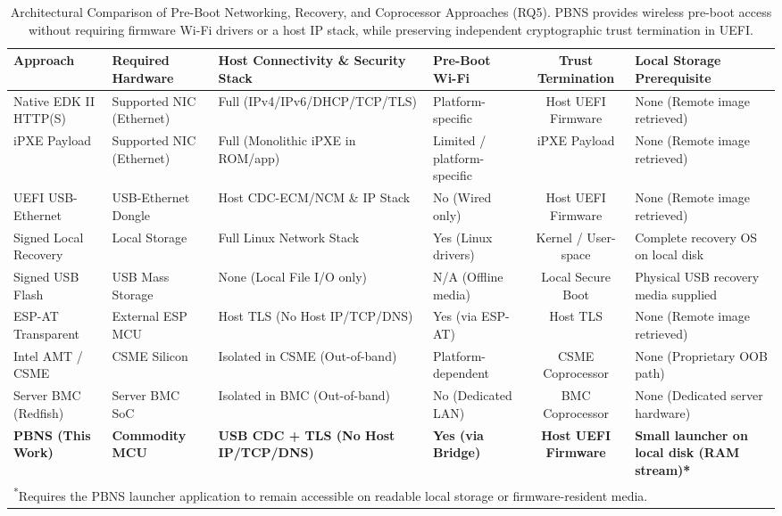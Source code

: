 \begin{table}[t]
\centering
\footnotesize
\renewcommand{\arraystretch}{0.92}
\caption{Architectural Comparison of Pre-Boot Networking, Recovery, and Coprocessor Approaches (RQ5). PBNS provides wireless pre-boot access without requiring firmware Wi-Fi drivers or a host IP stack, while preserving independent cryptographic trust termination in UEFI.}
\label{tab:rq4-comparison}
\begin{tabularx}{\textwidth}{llp{3.2cm}lcX}
\toprule
\textbf{Approach} & \textbf{Required Hardware} & \textbf{Host Connectivity \& Security Stack} & \textbf{Pre-Boot Wi-Fi} & \textbf{Trust Termination} & \textbf{Local Storage Prerequisite} \\
\midrule
Native EDK II HTTP(S) & Supported NIC (Ethernet) & Full (IPv4/IPv6/DHCP/TCP/TLS) & Platform-specific & Host UEFI Firmware & None (Remote image retrieved) \\
iPXE Payload & Supported NIC (Ethernet) & Full (Monolithic iPXE in ROM/app) & Limited / platform-specific & iPXE Payload & None (Remote image retrieved) \\
UEFI USB-Ethernet & USB-Ethernet Dongle & Host CDC-ECM/NCM \& IP Stack & No (Wired only) & Host UEFI Firmware & None (Remote image retrieved) \\
Signed Local Recovery & Local Storage & Full Linux Network Stack & Yes (Linux drivers) & Kernel / User-space & Complete recovery OS on local disk \\
Signed USB Flash & USB Mass Storage & None (Local File I/O only) & N/A (Offline media) & Local Secure Boot & Physical USB recovery media supplied \\
ESP-AT Transparent & External ESP MCU & Host TLS (No Host IP/TCP/DNS) & Yes (via ESP-AT) & Host TLS & None (Remote image retrieved) \\
Intel AMT / CSME & CSME Silicon & Isolated in CSME (Out-of-band) & Platform-dependent & CSME Coprocessor & None (Proprietary OOB path) \\
Server BMC (Redfish) & Server BMC SoC & Isolated in BMC (Out-of-band) & No (Dedicated LAN) & BMC Coprocessor & None (Dedicated server hardware) \\
\midrule
\textbf{PBNS (This Work)} & \textbf{Commodity MCU} & \textbf{USB CDC + TLS (No Host IP/TCP/DNS)} & \textbf{Yes (via Bridge)} & \textbf{Host UEFI Firmware} & \textbf{Small launcher on local disk (RAM stream)* } \\
\bottomrule
\multicolumn{6}{l}{\footnotesize \textsuperscript{*}Requires the PBNS launcher application to remain accessible on readable local storage or firmware-resident media.}
\end{tabularx}
\end{table}
